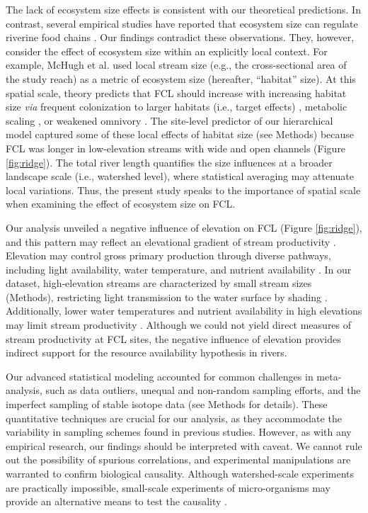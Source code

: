 \documentclass[11pt, class=article, crop=false]{standalone}
\begin{document}
The lack of ecosystem size effects is consistent with our theoretical predictions.
In contrast, several empirical studies have reported that ecosystem size can regulate riverine food chains \citep{mchugh_dual_2010, sabo_role_2010, mcintosh_capacity_2018}.
Our findings contradict these observations.
They, however, consider the effect of ecosystem size within an explicitly local context.
For example, McHugh et al. \citep{mchugh_dual_2010} used local stream size (e.g., the cross-sectional area of the study reach) as a metric of ecosystem size (hereafter, ``habitat'' size).
At this spatial scale, theory predicts that FCL should increase with increasing habitat size \textit{via} frequent colonization to larger habitats (i.e., target effects) \citep{shibasaki_food_2024}, metabolic scaling \citep{mcintosh_capacity_2018}, or weakened omnivory \citep{ward_mechanistic_2017}.
The site-level predictor of our hierarchical model captured some of these local effects of habitat size (see Methods) because FCL was longer in low-elevation streams with wide and open channels (Figure \ref{fig:ridge}).
The total river length quantifies the size influences at a broader landscape scale (i.e., watershed level), where statistical averaging may attenuate local variations. 
Thus, the present study speaks to the importance of spatial scale when examining the effect of ecosystem size on FCL.

Our analysis unveiled a negative influence of elevation on FCL (Figure \ref{fig:ridge}), and this pattern may reflect an elevational gradient of stream productivity \citep{marzolf_ecosystem_2021}.
Elevation may control gross primary production through diverse pathways, including light availability, water temperature, and nutrient availability \citep{marzolf_ecosystem_2021, atkinson_determinants_2018}.
In our dataset, high-elevation streams are characterized by small stream sizes (Methods), restricting light transmission to the water surface by shading \citep{finlay_light-mediated_2011, finlay_human_2013, bernhardt_light_2022}.
Additionally, lower water temperatures and nutrient availability in high elevations may limit stream productivity \citep{demars_temperature_2011}.
Although we could not yield direct measures of stream productivity at FCL sites, the negative influence of elevation provides indirect support for the resource availability hypothesis in rivers.

Our advanced statistical modeling accounted for common challenges in meta-analysis, such as data outliers, unequal and non-random sampling efforts, and the imperfect sampling of stable isotope data (see Methods for details).
These quantitative techniques are crucial for our analysis, as they accommodate the variability in sampling schemes found in previous studies.
However, as with any empirical research, our findings should be interpreted with caveat.
We cannot rule out the possibility of spurious correlations, and experimental manipulations are warranted to confirm biological causality.
Although watershed-scale experiments are practically impossible, small-scale experiments of micro-organisms may provide an alternative means to test the causality \citep{altermatt_big_2015, green_long_2023}.
\end{document}
